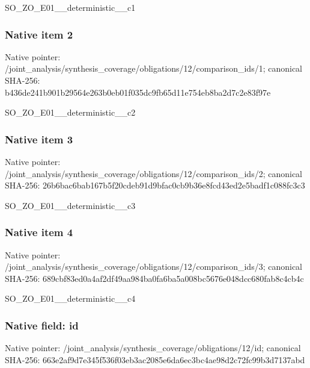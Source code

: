 \documentclass[10pt,a4paper]{article}
\begin{document}
\begingroup\raggedright\sloppy SO\_\allowbreak{}ZO\_\allowbreak{}E01\_\allowbreak{}\_\allowbreak{}deterministic\_\allowbreak{}\_\allowbreak{}c1\par\endgroup

\subsubsection{Native item 2}
Native pointer: /joint\_\allowbreak{}analysis/synthesis\_\allowbreak{}coverage/obligations/12/comparison\_\allowbreak{}ids/1; canonical SHA-256: b436de241b901b29564e263b0eb01f035dc9fb65d11e754eb8ba2d7c2e83f97e

\begingroup\raggedright\sloppy SO\_\allowbreak{}ZO\_\allowbreak{}E01\_\allowbreak{}\_\allowbreak{}deterministic\_\allowbreak{}\_\allowbreak{}c2\par\endgroup

\subsubsection{Native item 3}
Native pointer: /joint\_\allowbreak{}analysis/synthesis\_\allowbreak{}coverage/obligations/12/comparison\_\allowbreak{}ids/2; canonical SHA-256: 26b6bac6bab167b5f20cdeb91d9bfac0cb9b36e8fcd43ed2e5badf1c088fc3c3

\begingroup\raggedright\sloppy SO\_\allowbreak{}ZO\_\allowbreak{}E01\_\allowbreak{}\_\allowbreak{}deterministic\_\allowbreak{}\_\allowbreak{}c3\par\endgroup

\subsubsection{Native item 4}
Native pointer: /joint\_\allowbreak{}analysis/synthesis\_\allowbreak{}coverage/obligations/12/comparison\_\allowbreak{}ids/3; canonical SHA-256: 689cbf83ed0a4af2df49aa984ba0fa6ba5a008bc5676e048dcc680fab8c4cb4c

\begingroup\raggedright\sloppy SO\_\allowbreak{}ZO\_\allowbreak{}E01\_\allowbreak{}\_\allowbreak{}deterministic\_\allowbreak{}\_\allowbreak{}c4\par\endgroup

\subsubsection{Native field: id}
Native pointer: /joint\_\allowbreak{}analysis/synthesis\_\allowbreak{}coverage/obligations/12/id; canonical SHA-256: 663e2af9d7e345f536f03eb3ac2085e6da6ec3bc4ae98d2c72fc99b3d7137abd
\end{document}
